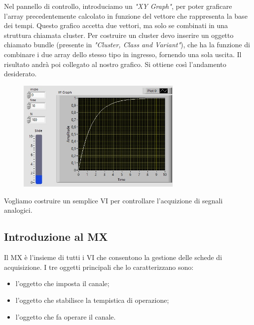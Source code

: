 Nel pannello di controllo, introduciamo un \textit{"XY Graph"}, per poter graficare l'array precedentemente calcolato in funzione del vettore che rappresenta la base dei tempi. Questo grafico accetta due vettori, ma solo se combinati in una struttura chiamata cluster. Per costruire un cluster devo inserire un oggetto chiamato bundle (presente in \textit{"Cluster, Class and Variant"}), che ha la funzione di combinare i due array dello stesso tipo in ingresso, fornendo una sola uscita. Il risultato andrà poi collegato al nostro grafico.
Si ottiene così l'andamento desiderato.
\begin{figure}[H]
\caption{}
    \includegraphics[width=8cm]{settimana_1/immagini/grafico_esponenziale.jpg}
    \centering
\end{figure}

Vogliamo costruire un semplice VI per controllare l'acquizione di segnali analogici.

\subsection*{Introduzione al MX}
Il MX è l'insieme di tutti i VI che consentono la gestione delle schede di acquisizione. I tre oggetti principali che lo caratterizzano sono:
\begin{itemize}
    \item l'oggetto che imposta il canale;
    \item l'oggetto che stabilisce la tempistica di operazione;
    \item l'oggetto che fa operare il canale.
\end{itemize}


